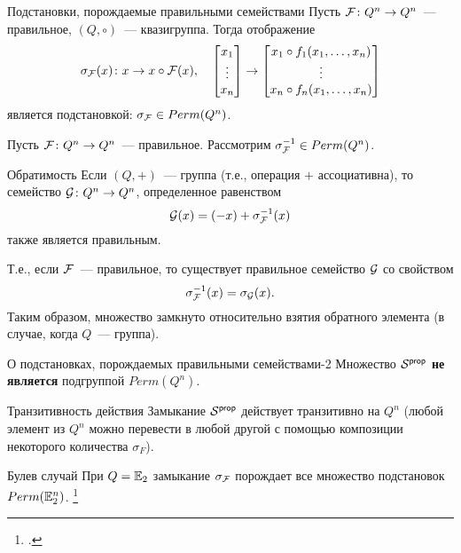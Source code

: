 \begin{frame}{Подстановки, порождаемые правильными семействами}
    Пусть $\mathcal{F} \colon Q^n \to Q^n$~--- правильное, $(Q, \circ)$~--- квазигруппа.
    Тогда отображение
    \[ 
        \sigma_{\mathcal{F}}(x) \colon x \to x \circ \mathcal{F}(x),
        \quad
        \begin{bmatrix}
            x_1 \\
            \vdots \\
            x_n
        \end{bmatrix} 
        \to 
        \begin{bmatrix}
            x_1 \circ f_1(x_1, \ldots, x_n) \\
            \vdots \\
            x_n \circ f_n(x_1, \ldots, x_n)
        \end{bmatrix}
    \]
    является подстановкой: $\sigma_{\mathcal{F}} \in Perm(Q^n)$.
\end{frame}


\begin{frame}
    Пусть $\mathcal{F} \colon Q^n \to Q^n$~--- правильное.
    Рассмотрим $\sigma^{-1}_{\mathcal{F}} \in Perm(Q^n)$.
    \begin{mytheorem}{Обратимость }
        Если $(Q, +)$~--- группа (т.е., операция $+$ ассоциативна), то семейство $\mathcal{G} \colon Q^n \to Q^n$, определенное равенством
        \[
            \mathcal{G}(x) = (-x) + \sigma_{\mathcal{F}}^{-1}(x)
        \]
        также является правильным.
    \end{mytheorem}
    \pause
    Т.е., если $\mathcal{F}$~--- правильное, то существует правильное семейство $\mathcal{G}$ со свойством
    \[
        \sigma^{-1}_{\mathcal{F}}(x) = \sigma_{\mathcal{G}}(x).
    \]
    \pause
    Таким образом, множество  замкнуто относительно взятия обратного элемента (в случае, когда $Q$~--- группа).
\end{frame}


\begin{frame}{О подстановках, порождаемых правильными семействами-2}
    Множество $\mathcal{S}^{\mathsf{prop}}$ \textbf{не является} подгруппой $Perm(Q^n)$.
    
    \pause 
    \begin{mytheorem}{Транзитивность действия}
        Замыкание $\mathcal{S}^{\mathsf{prop}}$ действует транзитивно на $Q^n$ (любой элемент из $Q^n$ можно перевести в любой другой с помощью композиции некоторого количества $\sigma_{F}$).
    \end{mytheorem}
    \pause 
    \begin{mypropos}{Булев случай}
        При $Q = \mathbb{E}_2$ замыкание $\sigma_{\mathcal{F}}$ порождает все множество подстановок $Perm(\mathbb{E}_2^n)$.
        \footcitetext{USOphd}
    \end{mypropos}
\end{frame}


